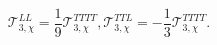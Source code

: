 \begin{equation}
\mathcal{T}_{3,\chi }^{LL}=\frac{1}{9}\mathcal{T}_{3,\chi }^{TTTT},\mathcal{T%
}_{3,\chi }^{TTL}=-\frac{1}{3}\mathcal{T}_{3,\chi }^{TTTT}.
\end{equation}%

